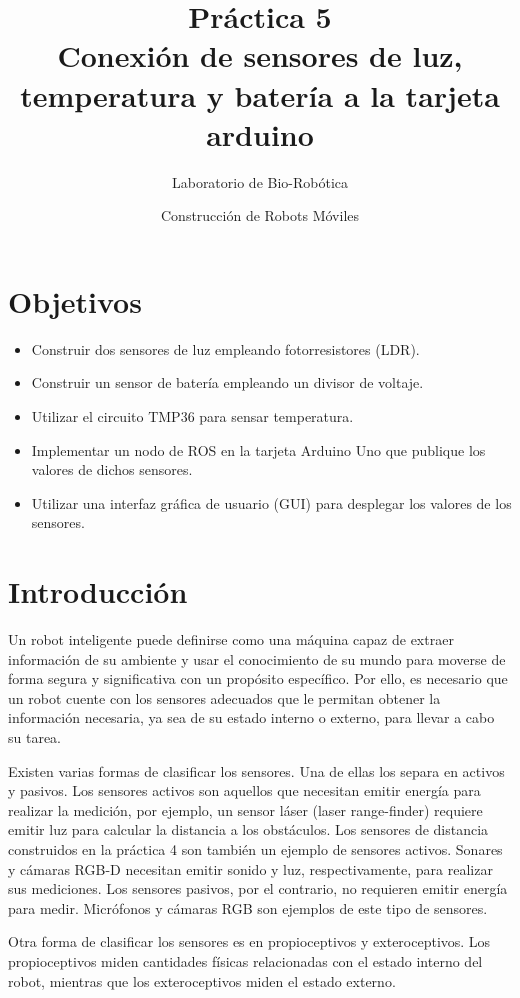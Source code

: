 \documentclass[a4paper,12pt]{article}
\title{Práctica 5 \\ Conexión de sensores de luz, temperatura y batería a la tarjeta arduino}
\author{Laboratorio de Bio-Robótica}
\date{Construcción de Robots Móviles}
\begin{document}
\renewcommand{\tablename}{Tabla}
\maketitle
\section*{Objetivos}
\begin{itemize}
\item Construir dos sensores de luz empleando fotorresistores (LDR).
\item Construir un sensor de batería empleando un divisor de voltaje.
\item Utilizar el circuito TMP36 para sensar temperatura.
\item Implementar un nodo de ROS en la tarjeta Arduino Uno que publique los valores  de dichos sensores. 
\item Utilizar una interfaz gráfica de usuario (GUI) para desplegar los valores de los sensores. 
\end{itemize}

\section{Introducción}
Un robot inteligente puede definirse como una máquina capaz de extraer información de su ambiente y usar el conocimiento de su mundo para moverse de forma segura y significativa con un propósito específico. Por ello, es necesario que un robot cuente con los sensores adecuados que le permitan obtener la información necesaria, ya sea de su estado interno o externo, para llevar a cabo su tarea. 

Existen varias formas de clasificar los sensores. Una de ellas los separa en activos y pasivos. Los sensores activos son aquellos que necesitan emitir energía para realizar la medición, por ejemplo, un sensor láser (laser range-finder) requiere emitir luz para calcular la distancia a los obstáculos. Los sensores de distancia construidos en la práctica 4 son también un ejemplo de sensores activos. Sonares y cámaras RGB-D necesitan emitir sonido y luz, respectivamente, para realizar sus mediciones. Los sensores pasivos, por el contrario, no requieren emitir energía para medir. Micrófonos y cámaras RGB son ejemplos de este tipo de sensores. 

Otra forma de clasificar los sensores es en propioceptivos y exteroceptivos. Los propioceptivos miden cantidades físicas relacionadas con el estado interno del robot, mientras que los exteroceptivos miden el estado externo. 
\end{document}
